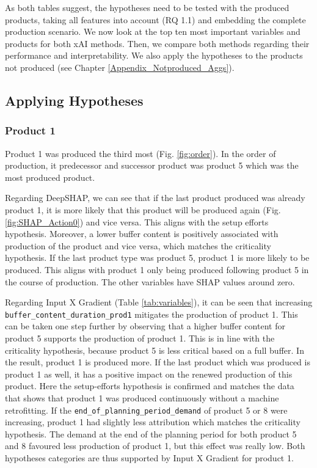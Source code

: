 As both tables suggest, the hypotheses need to be tested with the produced products, taking all features into account (RQ 1.1) and embedding the complete production scenario. We now look at the top ten most important variables and products for both xAI methods. Then, we compare both methods regarding their performance and interpretability. We also apply the hypotheses to the products not produced (see Chapter \ref{Appendix_Notproduced_Aggs}).

\subsection{Applying Hypotheses}
\subsubsection{Product 1}
Product 1 was produced the third most (Fig. \ref{fig:order}). In the order of production, it predecessor and successor product was product 5 which was the most produced product.

Regarding DeepSHAP, we can see that if the last product produced was already product 1, it is more likely that this product will be produced again (Fig. {\ref{fig:SHAP_Action0}}) and vice versa. This aligns with the setup efforts hypothesis. Moreover, a lower buffer content is positively associated with production of the product and vice versa, which matches the criticality hypothesis.
If the last product type was product 5, product 1 is more likely to be produced. This aligns with product 1 only being produced following product 5 in the course of production. The other variables have SHAP values around zero.

Regarding Input X Gradient (Table \ref{tab:variables}), it can be seen that increasing \texttt{buffer\_content\_duration\_prod1} mitigates the production of product 1. This can be taken one step further by observing that a higher buffer content for product 5 supports the production of product 1. This is in line with the criticality hypothesis, because product 5 is less critical based on a full buffer. In the result, product 1 is produced more. If the last product which was produced is product 1 as well, it has a positive impact on the renewed production of this product. Here the setup-efforts hypothesis is confirmed and matches the data that shows that product 1 was produced continuously without a machine retrofitting. If the \texttt{end\_of\_planning\_period\_demand} of product 5 or 8 were increasing, product 1 had slightly less attribution which matches the criticality hypothesis. The demand at the end of the planning period for both product 5 and 8 favoured less production of product 1, but this effect was really low.
Both hypotheses categories are thus supported by Input X Gradient for product 1.

